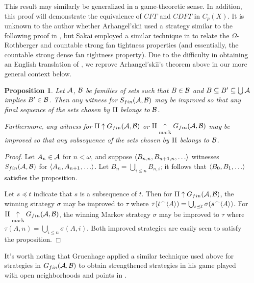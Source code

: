 \documentclass{amsart}
\theoremstyle{plain}
\newtheorem{proposition}[theorem]{Proposition}
\theoremstyle{definition}
\theoremstyle{remark}
\theoremstyle{plain}
\theoremstyle{definition}
\theoremstyle{remark}
\begin{document}
This result may similarly be generalized in a game-theoretic sense.
In addition, this proof will demonstrate the equivalence of
\(CFT\) and \(CDFT\) in \(C_p(X)\).
It is unknown to the author whether Arhangel'skii
used a strategy similar to the following proof in \cite{MR837289},
but Sakai employed a similar technique
in \cite{MR964873} to relate the \(\Omega\)-Rothberger and
countable strong fan tightness properties
(and essentially, the countable strong dense fan tightness property).
Due to the difficulty in obtaining an English translation of
\cite{MR837289}, we reprove Arhangel'skii's theorem above in our
more general context below.

\begin{proposition}\label{cofinalSequence}
  Let \(\mathcal{A}\), \(\mathcal{B}\) be families of sets such that
  \(B\in\mathcal{B}\) and \(B\subseteq B'\subseteq\bigcup\mathcal{A}\)
  implies \(B'\in\mathcal{B}\).
  Then any witness for \(S_{fin}(\mathcal{A},\mathcal{B})\)
  may be improved so that any final sequence of the sets chosen by \(\mathrm{II}\)
  belongs to \(\mathcal{B}\).

  Furthermore, any witness for
  \(\mathrm{II}\uparrow G_{fin}(\mathcal{A},\mathcal{B})\) or
  \(\mathrm{II}\underset{\text{mark}}{\uparrow}G_{fin}(\mathcal{A},\mathcal{B})\)
  may be improved so that any subsequence of the sets chosen by \(\mathrm{II}\)
  belongs to \(\mathcal{B}\).
\end{proposition}

\begin{proof}
  Let \(A_n\in\mathcal{A}\) for \(n<\omega\), and suppose
  \(\<B_{n,n},B_{n+1,n},\dots\>\) witnesses \(S_{fin}(\mathcal{A},\mathcal{B})\)
  for \(\<A_n,A_{n+1},\dots\>\).
  Let \(B_n=\bigcup_{i\leq n}B_{n,i}\); it follows that
  \(\<B_0,B_1,\dots\>\) satisfies the proposition.

  Let \(s\preceq t\) indicate that \(s\) is a subsequence
  of \(t\). Then for \(\mathrm{II}\uparrow G_{fin}(\mathcal{A},\mathcal{B})\),
  the winning strategy \(\sigma\) may be improved to
  \(\tau\) where
  \(
    \tau(t{^\frown}\langle A\rangle)
      =
    \bigcup_{s\preceq t}\sigma(s{^\frown}\langle A\rangle)
  \).
  For \(\mathrm{II}\underset{\text{mark}}{\uparrow}G_{fin}(\mathcal{A},\mathcal{B})\),
  the winning Markov strategy \(\sigma\) may
  be improved to \(\tau\) where
  \(
    \tau(A,n)
      =
    \bigcup_{i\leq n}\sigma(A,i)
  \). Both improved strategies are easily seen to satisfy the proposition.
\end{proof}

It's worth noting that Gruenhage applied a similar technique used above
for strategies in \(G_{fin}(\mathcal{A},\mathcal{B})\) to obtain strengthened
strategies in his game played with open neighborhoods and points in
\cite{MR0413049}.
\end{document}
